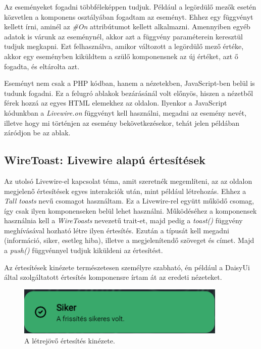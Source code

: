 \documentclass[
]{thesis-ekf}
\theoremstyle{definition}
\theoremstyle{remark}
\begin{document}
Az eseményeket fogadni többféleképpen tudjuk. Például a legördülő mezők esetén közvetlen a komponens osztályában fogadtam az eseményt. Ehhez egy függvényt kellett írni, aminél az \emph{\#On} attribútumot kellett alkalmazni. Amennyiben egyéb adatok is várunk az eseménynél, akkor azt a függvény paraméterein keresztül tudjuk megkapni. Ezt felhasználva, amikor változott a legördülő mező értéke, akkor egy eseményben kiküldtem a szülő komponensnek az új értéket, azt ő fogadta, és eltárolta azt.

Eseményt nem csak a PHP kódban, hanem a nézetekben, JavaScript-ben belül is tudunk fogadni. Ez a felugró ablakok bezárásánál volt előnyös, hiszen a nézetből férek hozzá az egyes HTML elemekhez az oldalon. Ilyenkor a JavaScript kódunkban a \emph{Livewire.on} függvényt kell használni, megadni az esemény nevét, illetve hogy mi történjen az esemény bekövetkezésekor, tehát jelen példában záródjon be az ablak.



\subsection{WireToast: Livewire alapú értesítések}

Az utolsó Livewire-el kapcsolat téma, amit szeretnék megemlíteni, az az oldalon megjelenő értesítések egyes interakciók után, mint például létrehozás. Ehhez a \emph{Tall toasts}\cite{talltoasts} nevű csomagot használtam. Ez a Livewire-rel együtt működő csomag, így csak ilyen komponenseken belül lehet használni. Működéséhez a komponensek használnia kell a \emph{WireToasts} nevezetű trait-et, majd pedig a \emph{toast()} függvény meghívásával hozható létre ilyen értesítés. Ezután a típusát kell megadni (információ, siker, esetleg hiba), illetve a megjelenítendő szöveget és címet. Majd a \emph{push()} függvénnyel tudjuk kiküldeni az értesítést.



Az értesítések kinézete természetesen személyre szabható, én például a DaisyUi által szolgáltatott értesítés komponensre írtam át az eredeti nézeteket.

\begin{figure}[ht!]
	\centering
	\includegraphics[width=10cm]{../pictures/screenshots/notif.png}
	\caption{A létrejövő értesítés kinézete.}
	\label{toastUI}
\end{figure}
\end{document}
